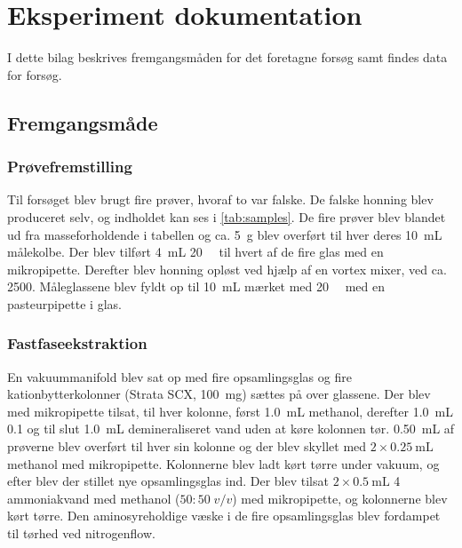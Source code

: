 \chapter{Eksperiment dokumentation}
I dette bilag beskrives fremgangsmåden for det foretagne forsøg samt findes data for forsøg.
\section{Fremgangsmåde}\label{appsec:sample-prep}
\subsection{Prøvefremstilling}
Til forsøget blev brugt fire prøver, hvoraf to var falske. De falske honning blev produceret selv, og indholdet kan ses i \cref{tab:samples}.
De fire prøver blev blandet ud fra masseforholdende i tabellen og ca. \qty{5}{\gram}\footnotemark{} blev overført til hver deres \qty{10}{\milli\liter} målekolbe.
Der blev tilført \qty{4}{\milli\liter} \qty{20}{\milli\molar}  til hvert af de fire glas med en mikropipette.
Derefter blev honning opløst ved hjælp af en vortex mixer, ved ca. \qty{2500}{\rpm}.
Måleglassene blev fyldt op til \qty{10}{\milli\liter} mærket med \qty{20}{\milli\molar}  med en pasteurpipette i glas.
\subsection{Fastfaseekstraktion}
En vakuummanifold blev sat op med fire opsamlingsglas og fire kationbytterkolonner (Strata SCX, \qty{100}{\milli\gram}) sættes på over glassene.
Der blev med mikropipette tilsat, til hver kolonne, først \qty{1.0}{\milli\liter} methanol, derefter \qty{1.0}{\milli\liter} \qty{0.1}{\molar}  og til slut \qty{1.0}{\milli\liter} demineraliseret vand uden at køre kolonnen tør.
\qty{0.50}{\milli\liter} af prøverne blev overført til hver sin kolonne og der blev skyllet med $2\times \qty{0.25}{\milli\liter}$ methanol med mikropipette.
Kolonnerne blev ladt kørt tørre under vakuum, og efter blev der stillet nye opsamlingsglas ind.
Der blev tilsat $2\times \qty{0.5}{\milli\liter}$ \qty{4}{\molar} ammoniakvand med methanol ($50\!:\!50\; v/v$) med mikropipette, og kolonnerne blev kørt tørre.
Den aminosyreholdige væske i de fire opsamlingsglas blev fordampet til tørhed ved nitrogenflow.
